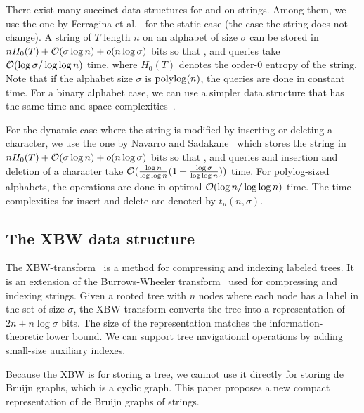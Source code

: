 
There exist many succinct data structures for {\rank} and {\select} on strings.
Among them, we use the one by Ferragina et al.~\cite{FerManMakNav06} for the static case
(the case the string does not change).  A string of $T$ length $n$ on an alphabet of size $\sigma$
can be stored in $nH_0(T) + \mathcal{O}(\sigma \log n) + o(n \log\sigma)$ bits so that
{\rank}, {\select} and {\access} queries take $\mathcal{O}(\log\sigma / \log\log n)$ time,
where $H_0(T)$ denotes the order-$0$ entropy of the string.  Note that if the alphabet size $\sigma$
is ${\mathop{\mathrm{polylog}}\nolimits}(n)$, the queries are done in constant time.  For a binary alphabet case,
we can use a simpler data structure that has the same time and space complexities~\cite{RRR07}.

For the dynamic case where the string is modified by inserting or deleting a character,
we use the one by Navarro and Sadakane~\cite{NavSad10} which stores the string
in $nH_0(T) + \mathcal{O}(\sigma \log n) + o(n \log\sigma)$ bits so that
{\rank}, {\select} and {\access} queries and insertion and deletion of a character take
$\mathcal{O}(\frac{\log n}{\log \log n}(1+\frac{\log\sigma}{\log\log n}))$ time.
For polylog-sized alphabets, the operations are done in optimal $\mathcal{O}(\log n/\log \log n)$ time.
The time complexities for insert and delete are denoted by $t_u(n,\sigma)$.


\subsection{The XBW data structure}
The XBW-transform~\cite{FLMM09} is a method for compressing and indexing labeled trees.
It is an extension of the Burrows-Wheeler transform~\cite{BurWhe94} used for compressing
and indexing strings.  Given a rooted tree with $n$ nodes where each node has a label in
the set of size $\sigma$, the XBW-transform converts the tree into a representation of
$2n + n \log\sigma$ bits.  The size of the representation matches the information-theoretic
lower bound.  We can support tree navigational operations by adding small-size auxiliary
indexes.

Because the XBW is for storing a tree, we cannot use it directly for storing de Bruijn graphs,
which is a cyclic graph.
This paper proposes a new compact representation of de Bruijn graphs of strings.


